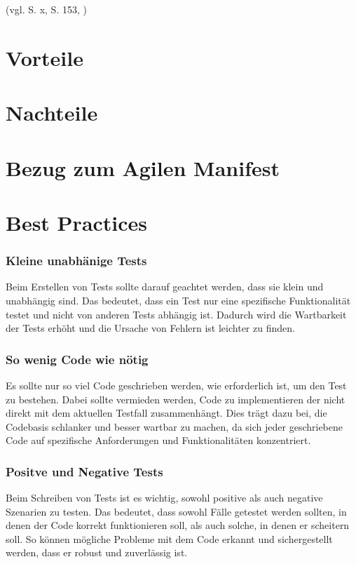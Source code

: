 \documentclass[a0,landscape]{a0poster}
\begin{document}
\begin{multicols}{4}
(vgl. \cite{beck_test_2022} S. x, \cite{schatten_qualitatssicherung_2010} S. 153, \cite{ionos_test_2020})


\section*{Vorteile}

\section*{Nachteile}

\section*{Bezug zum Agilen Manifest}

\section*{Best Practices}

\subsubsection*{Kleine unabhänige Tests}
Beim Erstellen von Tests sollte darauf geachtet werden, dass sie klein und unabhängig sind. Das bedeutet, dass ein Test nur eine spezifische Funktionalität testet und nicht von anderen Tests abhängig ist. Dadurch wird die Wartbarkeit der Tests erhöht und die Ursache von Fehlern ist leichter zu finden.

\subsubsection*{So wenig Code wie nötig}
Es sollte nur so viel Code geschrieben werden, wie erforderlich ist, um den Test zu bestehen. Dabei sollte vermieden werden, Code zu implementieren der nicht direkt mit dem aktuellen Testfall zusammenhängt. Dies trägt dazu bei, die Codebasis schlanker und besser wartbar zu machen, da sich jeder geschriebene Code auf spezifische Anforderungen und Funktionalitäten konzentriert.

\subsubsection*{Positve und Negative Tests}
Beim Schreiben von Tests ist es wichtig, sowohl positive als auch negative Szenarien zu testen. Das bedeutet, dass sowohl Fälle getestet werden sollten, in denen der Code korrekt funktionieren soll, als auch solche, in denen er scheitern soll. So können mögliche Probleme mit dem Code erkannt und sichergestellt werden, dass er robust und zuverlässig ist.


\end{multicols}
\end{document}
